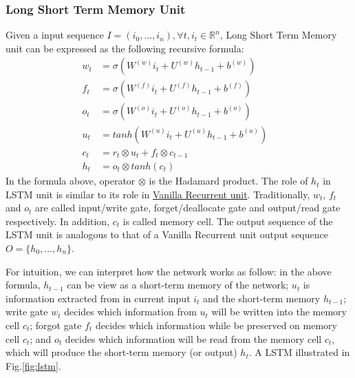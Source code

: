 \subsubsection{Long Short Term Memory Unit}
Given a input sequence \(I = (i_0,\ldots,i_n), \forall t, i_t \in \mathbb{R}^n\), Long Short Term Memory unit can be expressed as the following recursive formula\cite{treeLSTM}:
\begin{align}
	w_t &= \sigma(W^{(w)}i_t + U^{(w)}h_{t-1} + b^{(w)}) \label{eq:lstm-input-gate}&\\ 
  	f_t &= \sigma(W^{(f)}i_t + U^{(f)}h_{t-1} + b^{(f)}) \label{eq:lstm-forget-gate}&\\ 
  	o_t &= \sigma(W^{(o)}i_t + U^{(o)}h_{t-1} + b^{(o)}) \label{eq:lstm-output-gate}&\\ 
  	u_t &= tanh(W^{(u)}i_t + U^{(u)}h_{t-1} + b^{(u)}) \label{eq:lstm-update-gate}&\\ 
  	c_t &= r_t \otimes u_t + f_t \otimes c_{t-1} \label{eq:longterm-mem}&\\ 
  	h_t &= o_t \otimes tanh(c_t) \label{eq:temperal-mem}& 
\end{align}
In the formula above, operator \(\otimes\) is the Hadamard product\cite{element-prod}.
The role of \(h_t\) in LSTM unit is similar to its role in \hyperref[sec:vanilla-rnn]{Vanilla Recurrent unit}. 
Traditionally, \(w_t\), \(f_t\) and \(o_t\) are called input/write gate, forget/deallocate gate and output/read gate respectively. 
In addition, \(c_t\) is called memory cell. 
The output sequence of the LSTM unit is analogous to that of a Vanilla Recurrent unit output sequence \(O = \{h_0,\ldots,h_n\}\).

For intuition, we can interpret how the network works as follow: in the above formula, \(h_{t-1}\) can be view as a short-term memory of the network; \(u_t\) is information extracted from in current input \(i_t\) and the short-term memory \(h_{t-1}\); write gate \(w_t\) decides which information from \(u_t\) will be written into the memory cell \(c_t\); forgot gate \(f_t\) decides which information while be preserved on memory cell \(c_t\); and \(o_t\) decides which information will be read from the memory cell \(c_t\), which will produce the short-term memory (or output) \(h_t\). 
A LSTM illustrated in Fig.\ref{fig:lstm}.


